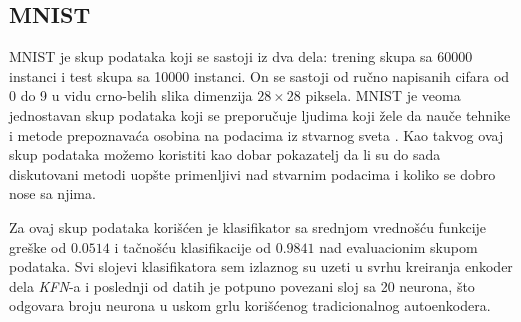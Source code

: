 \documentclass{article}
\begin{document}
	\subsection{MNIST}
	
	MNIST je skup podataka koji se sastoji iz dva dela: trening skupa sa 60000 instanci i test skupa sa 10000 instanci. 
	On se sastoji od ru\v cno napisanih cifara od 0 do 9 u vidu crno-belih slika dimenzija $28 \times 28$ piksela. 
	MNIST je veoma jednostavan skup podataka koji se preporu\v cuje ljudima koji \v zele da nau\v ce tehnike i metode prepoznava\'ca osobina na podacima iz stvarnog sveta \cite{lecun-mnisthandwrittendigit-2010}.
	Kao takvog ovaj skup podataka mo\v zemo koristiti kao dobar pokazatelj da li su do sada diskutovani metodi uop\v ste primenljivi nad stvarnim podacima i koliko se dobro nose sa njima.
	
	Za ovaj skup podataka kori\v s\'cen je klasifikator sa srednjom vredno\v s\'cu funkcije gre\v ske od $0.0514$ i ta\v cno\v s\'cu klasifikacije od $0.9841$ nad evaluacionim skupom podataka.
	Svi slojevi klasifikatora sem izlaznog su uzeti u svrhu kreiranja enkoder dela \emph{KFN}-a i poslednji od datih je potpuno povezani sloj sa 20 neurona, \v sto odgovara broju neurona u uskom grlu kori\v s\'cenog tradicionalnog autoenkodera.
	
\end{document}
